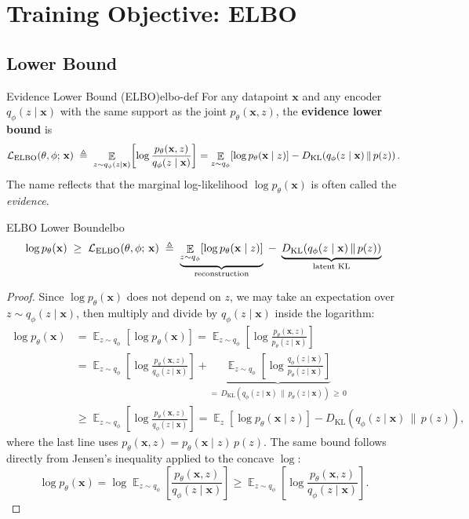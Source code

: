 \documentclass[11pt,a4paper]{article}
\DeclareMathOperator*{\E}{\mathbb{E}}
\newcommand{\bx}{\mathbf{x}} \newcommand{\by}{\mathbf{y}}
\newcommand{\KL}[2]{D_{\mathrm{KL}}\!\left(#1\,\|\,#2\right)}
\newcommand{\elbo}{\cL_{\mathrm{ELBO}}}
\begin{document}
\section{Training Objective: ELBO}\label{sec:elbo}

\subsection{Lower Bound}

\begin{definition}{Evidence Lower Bound (ELBO)}{elbo-def}
For any datapoint $\bx$ and any encoder $q_\phi(z\mid \bx)$ with the same support as the joint $p_\theta(\bx,z)$, the \textbf{evidence lower bound} is
\[
    \elbo(\theta,\phi;\,\bx)
    \;\triangleq\;
    \E_{z\sim q_\phi(z\mid \bx)}\!\left[\log\frac{p_\theta(\bx,z)}{q_\phi(z\mid \bx)}\right]
    =
    \E_{z\sim q_\phi}\!\left[\log p_\theta(\bx\mid z)\right]
    - \KL{q_\phi(z\mid \bx)}{p(z)} .
\]
The name reflects that the marginal log-likelihood $\log p_\theta(\bx)$ is often called the \emph{evidence}.
\end{definition}

\begin{theorem}{ELBO Lower Bound}{elbo}
\[
    \log p_\theta(\bx) \;\geq\; \elbo(\theta,\phi;\,\bx)
    \;\triangleq\;
    \underbrace{\E_{z\sim q_\phi}\!\left[\log p_\theta(\bx\mid z)\right]}_{\text{reconstruction}}
    \;-\;
    \underbrace{\KL{q_\phi(z\mid \bx)}{p(z)}}_{\text{latent KL}}
\]
\end{theorem}

\begin{proof}
Since $\log p_\theta(\bx)$ does not depend on $z$, we may take an expectation over $z\sim q_\phi(z\mid \bx)$, then multiply and divide by $q_\phi(z\mid \bx)$ inside the logarithm:
\begin{align*}
    \log p_\theta(\bx)
    &= \E_{z\sim q_\phi}\!\left[\log p_\theta(\bx)\right]
     = \E_{z\sim q_\phi}\!\left[\log \frac{p_\theta(\bx,z)}{p_\theta(z\mid \bx)}\right] \\
    &= \E_{z\sim q_\phi}\!\left[\log \frac{p_\theta(\bx,z)}{q_\phi(z\mid \bx)}\right]
     + \underbrace{\E_{z\sim q_\phi}\!\left[\log \frac{q_\phi(z\mid \bx)}{p_\theta(z\mid \bx)}\right]}_{=\,\KL{q_\phi(z\mid \bx)}{p_\theta(z\mid \bx)}\,\geq\,0}\\
    &\geq \E_{z\sim q_\phi}\!\left[\log\frac{p_\theta(\bx,z)}{q_\phi(z\mid \bx)}\right]
    = \E_z[\log p_\theta(\bx\mid z)] - \KL{q_\phi(z\mid \bx)}{p(z)},
\end{align*}
where the last line uses $p_\theta(\bx,z)=p_\theta(\bx\mid z)\,p(z)$. The same bound follows directly from Jensen's inequality applied to the concave $\log$:
\[
    \log p_\theta(\bx)
    = \log \E_{z\sim q_\phi}\!\left[\frac{p_\theta(\bx,z)}{q_\phi(z\mid \bx)}\right]
    \geq \E_{z\sim q_\phi}\!\left[\log\frac{p_\theta(\bx,z)}{q_\phi(z\mid \bx)}\right].
\]
\end{proof}
\end{document}
